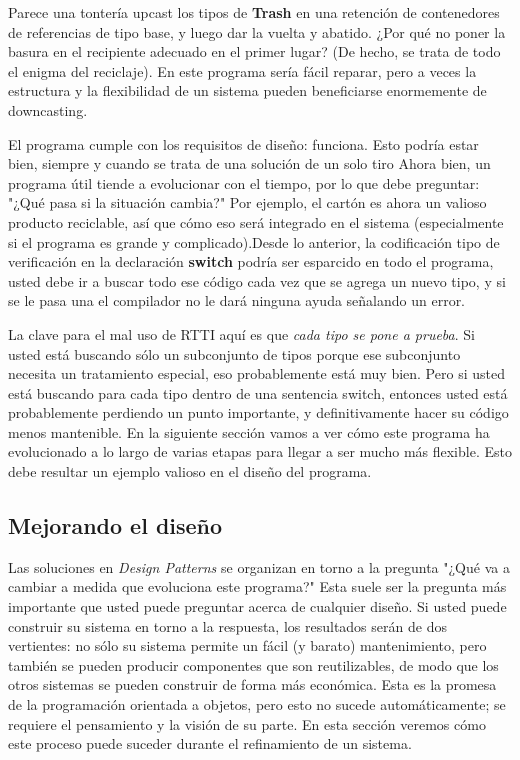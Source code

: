 Parece una tontería upcast los tipos de \textbf{Trash} en una retención de contenedores de referencias de tipo base, y luego dar la vuelta y abatido. ¿Por qué no poner la basura en el recipiente adecuado en el primer lugar? (De hecho, se trata de todo el enigma del reciclaje). En este programa sería fácil reparar, pero a veces la estructura y la flexibilidad de un sistema pueden beneficiarse enormemente de downcasting.     \newline

El programa cumple con los requisitos de diseño: funciona. Esto podría estar bien, siempre y cuando se trata de una solución de un solo tiro Ahora bien, un programa útil tiende a evolucionar con el tiempo, por lo que debe preguntar: "¿Qué pasa si la situación cambia?" Por ejemplo, el cartón es ahora un valioso producto reciclable, así que cómo eso será integrado en el sistema (especialmente si el programa es grande y complicado).Desde lo anterior, la codificación tipo de verificación en la declaración \textbf{switch} podría ser esparcido en todo el programa, usted debe ir a buscar todo ese código cada vez que se agrega un nuevo tipo, y si se le pasa una el compilador no le dará ninguna ayuda señalando un error.  \newline

La clave para el mal uso de RTTI aquí es que \textit{cada tipo se pone a prueba}. Si usted está buscando sólo un subconjunto de tipos porque ese subconjunto necesita un tratamiento especial, eso probablemente está muy bien. Pero si usted está buscando para cada tipo dentro de una sentencia switch, entonces usted está probablemente perdiendo un punto importante, y definitivamente hacer su código menos mantenible. En la siguiente sección vamos a ver cómo este programa ha evolucionado a lo largo de varias etapas para llegar a ser mucho más flexible. Esto debe resultar un ejemplo valioso en el diseño del programa.     \newline



\subsection*{Mejorando el diseño}
\label{subsec:med}



Las soluciones en \textit{Design Patterns} se organizan en torno a la pregunta "¿Qué va a cambiar a medida que evoluciona este programa?" Esta suele ser la pregunta más importante que usted puede preguntar acerca de cualquier diseño. Si usted puede construir su sistema en torno a la respuesta, los resultados serán de dos vertientes: no sólo su sistema permite un fácil (y barato) mantenimiento, pero también se pueden producir componentes que son reutilizables, de modo que los otros sistemas se pueden construir de forma más económica. Esta es la promesa de la programación orientada a objetos, pero esto no sucede automáticamente; se requiere el pensamiento y la visión de su parte. En esta sección veremos cómo este proceso puede suceder durante el refinamiento de un sistema.    \newline


